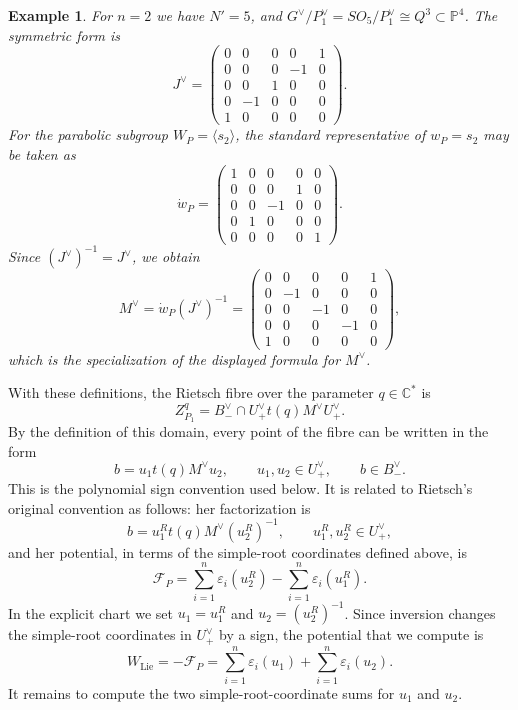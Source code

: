 \documentclass{article}
\newtheorem{exam}[thm]{Example}
\newcommand{\CC}{\mathbb{C}}
\newcommand{\PP}{\mathbb{P}}
\begin{document}
\begin{exam}\label{ex:dual-n2-matrices}
For \(n=2\) we have \(N'=5\), and \(G^\vee/P_1^\vee=SO_5/P_1^\vee\cong Q^3\subset\PP^4\). The symmetric form is
\[
J^\vee=
\begin{pmatrix}
0&0&0&0&1\\
0&0&0&-1&0\\
0&0&1&0&0\\
0&-1&0&0&0\\
1&0&0&0&0
\end{pmatrix}.
\]
For the parabolic subgroup \(W_P=\langle s_2\rangle\), the standard representative of \(w_P=s_2\) may be taken as
\[
\dot w_P=
\begin{pmatrix}
1&0&0&0&0\\
0&0&0&1&0\\
0&0&-1&0&0\\
0&1&0&0&0\\
0&0&0&0&1
\end{pmatrix}.
\]
Since \((J^\vee)^{-1}=J^\vee\), we obtain
\[
M^\vee=\dot w_P(J^\vee)^{-1}
=
\begin{pmatrix}
0&0&0&0&1\\
0&-1&0&0&0\\
0&0&-1&0&0\\
0&0&0&-1&0\\
1&0&0&0&0
\end{pmatrix},
\]
which is the specialization of the displayed formula for \(M^\vee\).
\end{exam}

With these definitions, the Rietsch fibre over the parameter \(q\in\CC^*\) is
\[
Z_{P_1}^{q}
=
B_-^\vee\cap U_+^\vee t(q)M^\vee U_+^\vee .
\]
By the definition of this domain, every point of the fibre can be written in the form
\[
b=u_1t(q)M^\vee u_2,
\qquad
u_1,u_2\in U_+^\vee,
\qquad
b\in B_-^\vee .
\]
This is the polynomial sign convention used below. It is related to Rietsch's original convention as follows: her factorization is
\[
b=u_1^{R}t(q)M^\vee (u_2^{R})^{-1},
\qquad
u_1^{R},u_2^{R}\in U_+^\vee,
\]
and her potential, in terms of the simple-root coordinates defined above, is
\[
\mathcal F_P=
\sum_{i=1}^n\varepsilon_i(u_2^{R})
-
\sum_{i=1}^n\varepsilon_i(u_1^{R}).
\]
In the explicit chart we set \(u_1=u_1^{R}\) and \(u_2=(u_2^{R})^{-1}\). Since inversion changes the simple-root coordinates in \(U_+^\vee\) by a sign, the potential that we compute is
\[
W_{\mathrm{Lie}}=-\mathcal F_P
=
\sum_{i=1}^n\varepsilon_i(u_1)+\sum_{i=1}^n\varepsilon_i(u_2).
\]
It remains to compute the two simple-root-coordinate sums for \(u_1\) and \(u_2\).
\end{document}
